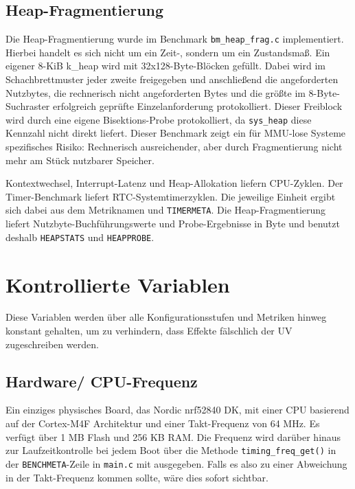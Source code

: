 \subsection{Heap-Fragmentierung}
Die Heap-Fragmentierung wurde im Benchmark \lstinline[style=fileinline]|bm_heap_frag.c| implementiert. Hierbei handelt es sich nicht um ein Zeit-, sondern um ein Zustandsmaß. Ein eigener 8-KiB k\_heap wird mit 32x128-Byte-Blöcken gefüllt. Dabei wird im Schachbrettmuster jeder zweite freigegeben und anschließend die angeforderten Nutzbytes, die rechnerisch nicht angeforderten Bytes und die größte im 8-Byte-Suchraster erfolgreich geprüfte Einzelanforderung protokolliert. Dieser Freiblock wird durch eine eigene Bisektions-Probe protokolliert, da \lstinline[style=fileinline]|sys_heap| diese Kennzahl nicht direkt liefert. Dieser Benchmark zeigt ein für MMU-lose Systeme spezifisches Risiko: Rechnerisch ausreichender, aber durch Fragmentierung nicht mehr am Stück nutzbarer Speicher.

Kontextwechsel, Interrupt-Latenz und Heap-Allokation liefern CPU-Zyklen. Der Timer-Benchmark liefert RTC-Systemtimerzyklen. Die jeweilige Einheit ergibt sich dabei aus dem Metriknamen und \lstinline[style=fileinline]|TIMERMETA|. Die Heap-Fragmentierung liefert Nutzbyte-Buchführungswerte und Probe-Ergebnisse in Byte und benutzt deshalb \lstinline[style=fileinline]|HEAPSTATS| und \lstinline[style=fileinline]|HEAPPROBE|.

\section{Kontrollierte Variablen}
Diese Variablen werden über alle Konfigurationsstufen und Metriken hinweg konstant gehalten, um zu verhindern, dass Effekte fälschlich der UV zugeschreiben werden.

\subsection{Hardware/ CPU-Frequenz}
Ein einziges physisches Board, das Nordic nrf52840 DK, mit einer CPU basierend auf der Cortex-M4F Architektur und einer Takt-Frequenz von 64 MHz. Es verfügt über 1 MB Flash und 256 KB RAM. Die Frequenz wird darüber hinaus zur Laufzeitkontrolle bei jedem Boot über die Methode \lstinline[style=fileinline]|timing_freq_get()| in der \lstinline[style=fileinline]|BENCHMETA|-Zeile in \lstinline[style=fileinline]|main.c| mit ausgegeben. Falls es also zu einer Abweichung in der Takt-Frequenz kommen sollte, wäre dies sofort sichtbar.

